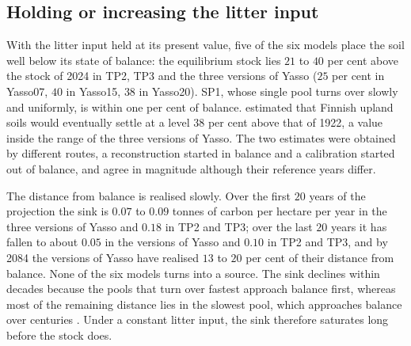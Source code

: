 \documentclass[11pt]{article}
\begin{document}
\subsection{Holding or increasing the litter input}\label{sec:headroom}

With the litter input held at its present value, five of the six models place the
soil well below its state of balance: the equilibrium stock lies $21$ to $40$ per cent
above the stock of 2024 in TP2, TP3 and the three versions of Yasso ($25$ per cent in
Yasso07, $40$ in Yasso15, $38$ in Yasso20). SP1, whose single pool turns over slowly and
uniformly, is within one per cent of balance. \citet{Liski2006} estimated that Finnish
upland soils would eventually settle at a level $38$ per cent above that of 1922, a
value inside the range of the three versions of Yasso. The two estimates were obtained
by different routes, a reconstruction started in balance and a calibration started out
of balance, and agree in magnitude although their reference years differ.

The distance from balance is realised slowly. Over the first $20$ years of the
projection the sink is $0.07$ to $0.09$ tonnes of carbon per hectare per year in the
three versions of Yasso and $0.18$ in TP2 and TP3; over the last $20$ years it
has fallen to about $0.05$ in the versions of Yasso and $0.10$ in TP2 and TP3, and by
2084 the versions of Yasso have realised $13$ to $20$ per cent of their distance from
balance. None of the six models turns into a source. The sink declines within decades
because the pools that turn over fastest approach balance first, whereas most of the
remaining distance lies in the slowest pool, which approaches balance over centuries
\citep{Sierra2018}. Under a constant litter input, the sink therefore saturates long
before the stock does.
\end{document}
